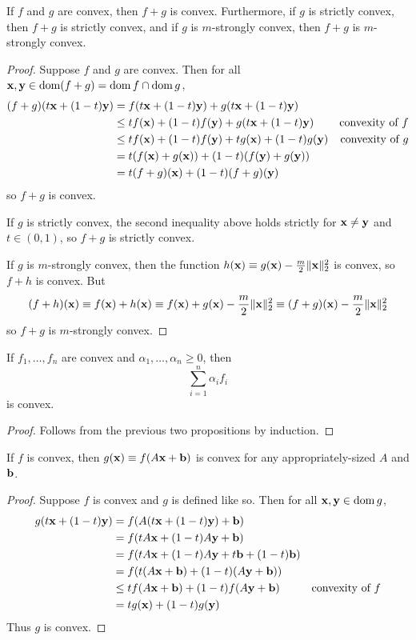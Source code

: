 \begin{proposition}
If $f$ and $g$ are convex, then $f+g$ is convex.
Furthermore, if $g$ is strictly convex, then $f+g$ is strictly convex, and if $g$ is $m$-strongly convex, then $f+g$ is $m$-strongly convex.
\end{proposition}
\begin{proof}
Suppose $f$ and $g$ are convex. Then for all $\mathbf{x}, \mathbf{y} \in \operatorname*{dom} (f+g) = \operatorname*{dom} f \cap \operatorname*{dom} g$,
\begin{align*}
(f+g)(t\mathbf{x} + (1-t)\mathbf{y}) &= f(t\mathbf{x} + (1-t)\mathbf{y}) + g(t\mathbf{x} + (1-t)\mathbf{y}) \\
&\leq tf(\mathbf{x}) + (1-t)f(\mathbf{y}) + g(t\mathbf{x} + (1-t)\mathbf{y}) & \text{convexity of $f$} \\
&\leq tf(\mathbf{x}) + (1-t)f(\mathbf{y}) + tg(\mathbf{x}) + (1-t)g(\mathbf{y}) & \text{convexity of $g$} \\
&= t(f(\mathbf{x}) + g(\mathbf{x})) + (1-t)(f(\mathbf{y}) + g(\mathbf{y})) \\
&= t(f+g)(\mathbf{x}) + (1-t)(f+g)(\mathbf{y})
\end{align*}
so $f + g$ is convex.

If $g$ is strictly convex, the second inequality above holds strictly for $\mathbf{x} \neq \mathbf{y}$ and $t \in (0,1)$, so $f+g$ is strictly convex.

If $g$ is $m$-strongly convex, then the function $h(\mathbf{x}) \equiv g(\mathbf{x}) - \frac{m}{2}\|\mathbf{x}\|_2^2$ is convex, so $f+h$ is convex.
But
\[(f+h)(\mathbf{x}) \equiv f(\mathbf{x}) + h(\mathbf{x}) \equiv f(\mathbf{x}) + g(\mathbf{x}) - \frac{m}{2}\|\mathbf{x}\|_2^2 \equiv (f+g)(\mathbf{x}) - \frac{m}{2}\|\mathbf{x}\|_2^2\]
so $f+g$ is $m$-strongly convex.
\end{proof}

\begin{proposition}
If $f_1, \dots, f_n$ are convex and $\alpha_1, \dots, \alpha_n \geq 0$, then
\[\sum_{i=1}^n \alpha_i f_i\]
is convex.
\end{proposition}
\begin{proof}
Follows from the previous two propositions by induction.
\end{proof}

\begin{proposition}
If $f$ is convex, then $g(\mathbf{x}) \equiv f(A\mathbf{x} + \mathbf{b})$ is convex for any appropriately-sized $A$ and $\mathbf{b}$.
\end{proposition}
\begin{proof}
Suppose $f$ is convex and $g$ is defined like so. Then for all $\mathbf{x}, \mathbf{y} \in \operatorname*{dom} g$,
\begin{align*}
g(t\mathbf{x} + (1-t)\mathbf{y}) &= f(A(t\mathbf{x} + (1-t)\mathbf{y}) + \mathbf{b}) \\
&= f(tA\mathbf{x} + (1-t)A\mathbf{y} + \mathbf{b}) \\
&= f(tA\mathbf{x} + (1-t)A\mathbf{y} + t\mathbf{b} + (1-t)\mathbf{b}) \\
&= f(t(A\mathbf{x} + \mathbf{b}) + (1-t)(A\mathbf{y} + \mathbf{b})) \\
&\leq tf(A\mathbf{x} + \mathbf{b}) + (1-t)f(A\mathbf{y} + \mathbf{b}) & \text{convexity of $f$} \\
&= tg(\mathbf{x}) + (1-t)g(\mathbf{y})
\end{align*}
Thus $g$ is convex.
\end{proof}

